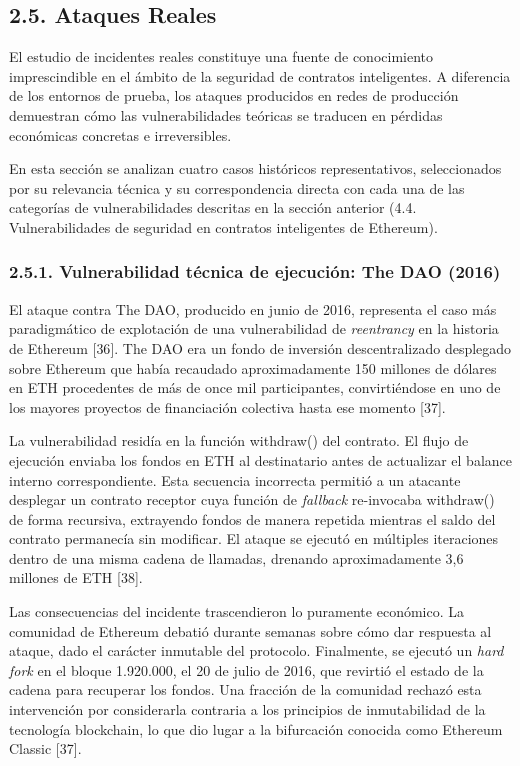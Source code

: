 \subsection{2.5. Ataques Reales}\label{ataques-reales}

El estudio de incidentes reales constituye una fuente de conocimiento
imprescindible en el ámbito de la seguridad de contratos inteligentes. A
diferencia de los entornos de prueba, los ataques producidos en redes de
producción demuestran cómo las vulnerabilidades teóricas se traducen en
pérdidas económicas concretas e irreversibles.

En esta sección se analizan cuatro casos históricos representativos,
seleccionados por su relevancia técnica y su correspondencia directa con
cada una de las categorías de vulnerabilidades descritas en la sección
anterior (4.4. Vulnerabilidades de seguridad en contratos inteligentes
de Ethereum).

\subsubsection{2.5.1. Vulnerabilidad técnica de ejecución: The DAO
(2016)}\label{vulnerabilidad-tuxe9cnica-de-ejecuciuxf3n-the-dao-2016}

El ataque contra The DAO, producido en junio de 2016, representa el caso
más paradigmático de explotación de una vulnerabilidad de
\emph{reentrancy} en la historia de Ethereum {[}36{]}. The DAO era un
fondo de inversión descentralizado desplegado sobre Ethereum que había
recaudado aproximadamente 150 millones de dólares en ETH procedentes de
más de once mil participantes, convirtiéndose en uno de los mayores
proyectos de financiación colectiva hasta ese momento {[}37{]}.

La vulnerabilidad residía en la función withdraw() del contrato. El
flujo de ejecución enviaba los fondos en ETH al destinatario antes de
actualizar el balance interno correspondiente. Esta secuencia incorrecta
permitió a un atacante desplegar un contrato receptor cuya función de
\emph{fallback} re-invocaba withdraw() de forma recursiva, extrayendo
fondos de manera repetida mientras el saldo del contrato permanecía sin
modificar. El ataque se ejecutó en múltiples iteraciones dentro de una
misma cadena de llamadas, drenando aproximadamente 3,6 millones de ETH
{[}38{]}.

Las consecuencias del incidente trascendieron lo puramente económico. La
comunidad de Ethereum debatió durante semanas sobre cómo dar respuesta
al ataque, dado el carácter inmutable del protocolo. Finalmente, se
ejecutó un \emph{hard fork} en el bloque 1.920.000, el 20 de julio de
2016, que revirtió el estado de la cadena para recuperar los fondos. Una
fracción de la comunidad rechazó esta intervención por considerarla
contraria a los principios de inmutabilidad de la tecnología blockchain,
lo que dio lugar a la bifurcación conocida como Ethereum Classic
{[}37{]}.

